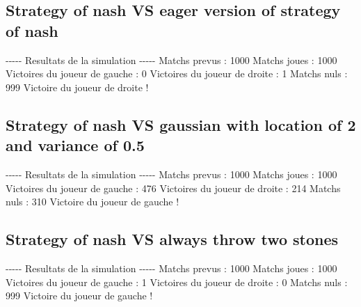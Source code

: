 \documentclass{article}%
\begin{document}
%
\subsection{Strategy of nash VS eager version of strategy of nash}%
\label{subsec:Strategy of nash VS eager version of strategy of nash}%
{-}{-}{-}{-}{-} Resultats de la simulation {-}{-}{-}{-}{-}\newline%
		\newline%
Matchs prevus : 1000\newline%
Matchs joues : 1000\newline%
\newline%
Victoires du joueur de gauche : 0\newline%
Victoires du joueur de droite : 1\newline%
Matchs nuls : 999\newline%
\newline%
Victoire du joueur de droite !

%
\subsection{Strategy of nash VS gaussian with location of 2 and variance of 0.5}%
\label{subsec:Strategy of nash VS gaussian with location of 2 and variance of 0.5}%
{-}{-}{-}{-}{-} Resultats de la simulation {-}{-}{-}{-}{-}\newline%
		\newline%
Matchs prevus : 1000\newline%
Matchs joues : 1000\newline%
\newline%
Victoires du joueur de gauche : 476\newline%
Victoires du joueur de droite : 214\newline%
Matchs nuls : 310\newline%
\newline%
Victoire du joueur de gauche !

%
\subsection{Strategy of nash VS always throw two stones}%
\label{subsec:Strategy of nash VS always throw two stones}%
{-}{-}{-}{-}{-} Resultats de la simulation {-}{-}{-}{-}{-}\newline%
		\newline%
Matchs prevus : 1000\newline%
Matchs joues : 1000\newline%
\newline%
Victoires du joueur de gauche : 1\newline%
Victoires du joueur de droite : 0\newline%
Matchs nuls : 999\newline%
\newline%
Victoire du joueur de gauche !
\end{document}
